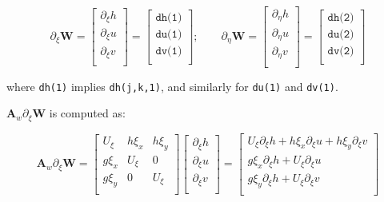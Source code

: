 \documentclass{article}
\newcommand{\code}[1]{\texttt{#1}}
\begin{document}
\[ \partial_\xi \mathbf{W} = 
\begin{bmatrix}
    \partial_\xi h \\
	\partial_\xi u \\
    \partial_\xi v \\
\end{bmatrix}
 =  {
	 \begin{bmatrix}
	 \code{dh(1)} \\
	 \code{du(1)} \\	 
	 \code{dv(1)} \\	 	 	 
\end{bmatrix} 
}  ;  \quad  \quad
\partial_\eta \mathbf{W} = 
\begin{bmatrix}
    \partial_\eta h \\
	\partial_\eta u \\
    \partial_\eta v \\
\end{bmatrix}
 =  {
	 \begin{bmatrix}
	 \code{dh(2)} \\
	 \code{du(2)} \\	 
	 \code{dv(2)} \\	 	 	 
\end{bmatrix} 
}
 \] 


where  \code{dh(1)} implies \code{dh(j,k,1)}, and similarly for  \code{du(1)} and  \code{dv(1)}. 

$ \mathbf{A}_w \partial_\xi \mathbf{W} $ is computed as:

\[ \mathbf{A}_w \partial_\xi \mathbf{W} = 
\begin{bmatrix}
    U_{\xi} & h \xi_x & h \xi_{y}  \\
    g \xi_x &    U_{\xi}  & 0   \\
    g \xi_y &   0   & U_{\xi}    \\           
\end{bmatrix} 
\begin{bmatrix}
    \partial_\xi h \\
	\partial_\xi u \\
    \partial_\xi v \\
\end{bmatrix}
 =  
	 \begin{bmatrix}
	  U_{\xi}  \partial_\xi h +  h \xi_x  \partial_\xi u + h \xi_{y} \partial_\xi v \\[.1cm]
	  g \xi_x \partial_\xi h  +  U_{\xi} \partial_\xi u    \\[.1cm]
	  g \xi_y  \partial_\xi h  +  U_{\xi}  \partial_\xi v  \\	 	 
\end{bmatrix} 
 \]
\end{document}
